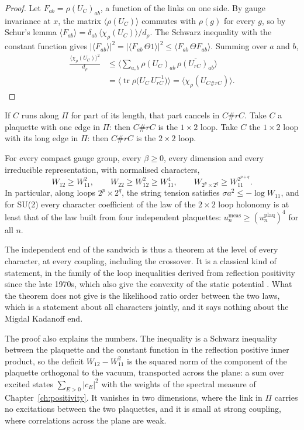 \begin{proof}
Let $F_{ab}=\rho(U_C)_{ab}$, a function of the links on one side. By gauge invariance at $x$, the matrix $\langle\rho(U_C)\rangle$ commutes with $\rho(g)$ for every $g$, so by Schur's lemma $\langle F_{ab}\rangle=\delta_{ab}\,\langle\chi_\rho(U_C)\rangle/d_\rho$. The Schwarz inequality with the constant function gives $|\langle F_{ab}\rangle|^2=|\langle F_{ab}\,\Theta1\rangle|^2\le\langle F_{ab}\,\Theta F_{ab}\rangle$. Summing over $a$ and $b$,
\begin{align*}
\frac{\langle\chi_\rho(U_C)\rangle^2}{d_\rho}&\le\Big\langle\sum_{a,b}\rho(U_C)_{ab}\,\overline{\rho(U_{rC})_{ab}}\Big\rangle\\
&=\big\langle\operatorname{tr}\rho\big(U_C\,U_{rC}^{-1}\big)\big\rangle=\langle\chi_\rho(U_{C\#rC})\rangle .
\end{align*}
\end{proof}

If $C$ runs along $\Pi$ for part of its length, that part cancels in $C\#rC$. Take $C$ a plaquette with one edge in $\Pi$: then $C\#rC$ is the $1\times2$ loop. Take $C$ the $1\times2$ loop with its long edge in $\Pi$: then $C\#rC$ is the $2\times2$ loop.

\begin{corollary}\label{cor:griffiths}
For every compact gauge group, every $\beta\ge0$, every dimension and every irreducible representation, with normalised characters,
\[
W_{12}\ge W_{11}^2,\qquad W_{22}\ge W_{12}^2\ge W_{11}^4,\qquad W_{2^p\times2^q}\ge W_{11}^{2^{p+q}} .
\]
In particular, along loops $2^p\times2^q$, the string tension satisfies $\sigma a^2\le-\log W_{11}$, and for SU(2) every character coefficient of the law of the $2\times2$ loop holonomy is at least that of the law built from four independent plaquettes: $u_n^{\mathrm{meas}}\ge(u_n^{\mathrm{plaq}})^4$ for all $n$.
\end{corollary}

The independent end of the sandwich is thus a theorem at the level of every character, at every coupling, including the crossover. It is a classical kind of statement, in the family of the loop inequalities derived from reflection positivity since the late 1970s, which also give the convexity of the static potential \cite{Ba86}. What the theorem does not give is the likelihood ratio order between the two laws, which is a statement about all characters jointly, and it says nothing about the Migdal Kadanoff end.

The proof also explains the numbers. The inequality is a Schwarz inequality between the plaquette and the constant function in the reflection positive inner product, so the deficit $W_{12}-W_{11}^2$ is the squared norm of the component of the plaquette orthogonal to the vacuum, transported across the plane: a sum over excited states $\sum_{E>0}|c_E|^2$ with the weights of the spectral measure of Chapter~\ref{ch:positivity}. It vanishes in two dimensions, where the link in $\Pi$ carries no excitations between the two plaquettes, and it is small at strong coupling, where correlations across the plane are weak.

